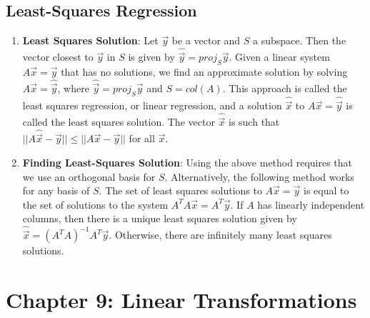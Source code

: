 \documentclass[10pt]{article}
\begin{document}
\subsection{Least-Squares Regression}
\begin{enumerate}
\item \textbf{Least Squares Solution}: Let $\vec{y}$ be a vector and $S$ a subspace. Then the vector closest to $\vec{y}$ in $S$ is given by $\hat{\vec{y}} = proj_S\vec{y}$. Given a linear system $A\vec{x} = \vec{y}$ that has no solutions, we find an approximate solution by solving $A\vec{x} = \hat{\vec{y}}$, where $\hat{\vec{y}} = proj_S\vec{y}$ and $S = col(A)$. This approach is called the least squares regression, or linear regression, and a solution $\hat{\vec{x}}$ to $A\vec{x} = \hat{\vec{y}}$ is called the least squares solution. The vector $\hat{\vec{x}}$ is such that $||A\hat{\vec{x}} - \vec{y}|| \leq ||A\vec{x} - \vec{y}||$ for all $\vec{x}$.
\item \textbf{Finding Least-Squares Solution}: Using the above method requires that we use an orthogonal basis for $S$. Alternatively, the following method works for any basis of $S$. The set of least squares solutions to $A\vec{x} = \vec{y}$ is equal to the set of solutions to the system $A^TA\vec{x} = A^T\vec{y}$. If $A$ has linearly independent columns, then there is a unique least squares solution given by $\hat{\vec{x}} = (A^TA)^{-1}A^T\vec{y}$. Otherwise, there are infinitely many least squares solutions.
\end{enumerate}
\section{Chapter 9: Linear Transformations}
\end{document}
